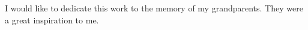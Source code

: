 I would like to dedicate this work to the memory of my grandparents.
They were a great inspiration to me.